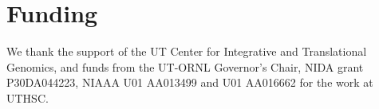 \documentclass{bioinfo}
\begin{document}
\section*{Funding}

We thank the support of the UT Center for Integrative and Translational Genomics, 
and funds from the UT-ORNL Governor's Chair, NIDA grant P30DA044223, NIAAA U01 
AA013499 and U01 AA016662 for the work at UTHSC. \vspace*{-12pt}


%
%
%
%

%

\end{document}
